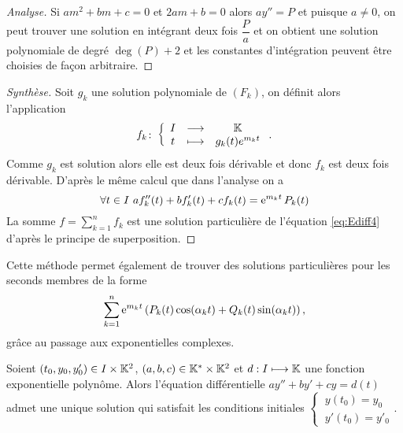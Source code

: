 \begin{proof}[Analyse]
Si \(am^2+bm+c = 0\) et \(2am+b = 0\) alors \(ay''=P\) et puisque \(a \neq 0\), on peut trouver une solution en intégrant deux fois \(\dfrac{P}{a}\) et on obtient une solution polynomiale de degré \(\deg(P)+2\) et les constantes d'intégration peuvent être choisies de façon arbitraire.
\end{proof}
\begin{proof}[Synthèse]
Soit \(g_k\) une solution polynomiale de \((F_k)\), on définit alors l'application
\begin{equation}
  f_k\colon \left\{\begin{array}{ccc} I & \longrightarrow &\mathbb{K}\\ t & \longmapsto & g_k(t)e^{m_k t} \end{array} \right..
\end{equation}
Comme \(g_k\) est solution alors elle est deux fois dérivable et donc \(f_k\) est deux fois dérivable. D'après le même calcul que dans l'analyse on a
  \begin{equation}
    \forall t \in I \ af_k''(t)+bf_k'(t)+cf_k(t)=\e^{m_k t} P_k(t)
  \end{equation}
La somme \(f=\sum_{k=1}^n f_k\) est une solution particulière de l'équation \eqref{eq:Ediff4} d'après le principe de superposition.
\end{proof}
%
Cette méthode permet également de trouver des solutions particulières pour les seconds membres de la forme
\begin{equation}
\sum_{k=1}^n \operatorname{e}^{m_k t} \left( P_k(t) \cos(\alpha_k t) +Q_k(t)\sin(\alpha_kt)\right),
\end{equation}
grâce au passage aux exponentielles complexes.
%
\begin{theo}
Soient \((t_0,y_0,y'_0) \in I \times \mathbb{K}^2\), \((a,b,c) \in \mathbb{K}^{*} \times \mathbb{K}^2\) et \(d: I \longmapsto \mathbb{K}\) une fonction exponentielle polynôme. Alors l'équation différentielle \(ay''+by'+cy=d(t)\) admet une unique solution qui satisfait les conditions initiales \( \left\{~\begin{array}{l} y(t_0)=y_0 \\ y'(t_0)=y'_0 \end{array}\right.\).
\end{theo}
